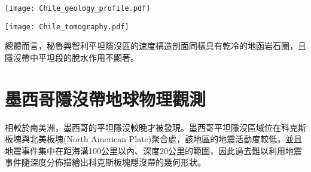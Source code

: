 \begin{figure*}[ht!]
    \centering
    \texttt{[image: Chile\_geology\_profile.pdf]}
    \caption[智利中部和阿根廷西部的地質構造與地震活動度背景圖，摘自\citealp{Marot2014}]{智利中部和阿根廷西部的地質構造與地震活動度背景圖，摘自\citealp{Marot2014}。(a)納茲卡板塊隱沒進入南美板塊的海溝由帶三角形的黑線標出。臨時地震網以倒三角形表示；地震分佈由灰點標出，紅色正三角形為活火山分佈，隱沒板塊等深度線資料來自\citealp{anderson2007geometry}。白線為智利與阿根廷的國界；白色圈圈為主要城市，其中黑色星星為智利首都聖地牙哥(Santiago)。灰線與灰透明底為推斷的胡安斐南德斯洋脊隱沒路徑與寬度，插圖為宏觀地圖，兩條黑色虛線為該研究中所觀測的剖面，分別為南緯31.5度(平坦隱沒區)與南緯33.5度(正常隱沒區)。(b)粗黑線標示主要地質縫合帶，帶三角形的黑細線為La Ramada與Aconcagua斷層，白色圈圈為主要城市，紅色正三角形為活火山分佈。(c)(d)為圖(a)中的剖面，黑色點顯示平坦板塊與正常板塊區域的地震活動，倒黑色三角形是海溝位置，紅色三角形是活火山。
    }
    \label{fig::Chile_geology_profile}
\end{figure*}

\begin{figure*}[h]
    \centering
    \texttt{[image: Chile\_tomography.pdf]}
    \caption[智利中部和阿根廷西部的熱模型與速度構造剖面，摘自\citealp{Marot2014}]{智利中部和阿根廷西部的熱模型與速度構造剖面，摘自\citealp{Marot2014}。由上至下為熱構造剖面、V$_P$速度變化、V$_S$速度變化與V$_P$/V$_S$比值，速度構造剖面中的等高線為絕對地震速度。紅點代表該研究地震層析成像所選用的地震事件。白線為莫荷面，灰線為隱沒板塊頂部。(a)為圖\ref{fig::Chile_geology_profile}a中的C剖面。(b)為圖\ref{fig::Chile_geology_profile}a中的D剖面。
    }
    \label{fig::Chile_tomography}
\end{figure*}

總體而言，秘魯與智利平坦隱沒區的速度構造剖面同樣具有乾冷的地函岩石圈，且隱沒帶中平坦段的脫水作用不顯著。

\section{墨西哥隱沒帶地球物理觀測}\label{墨西哥隱沒帶地球物理觀測}
相較於南美洲，墨西哥的平坦隱沒較晚才被發現。墨西哥平坦隱沒區域位在科克斯板塊與北美板塊(North American Plate)聚合處，該地區的地震活動度較低，並且地震事件集中在距海溝100公里以內、深度20公里的範圍，因此過去難以利用地震事件隨深度分佈描繪出科克斯板塊隱沒帶的幾何形狀。

